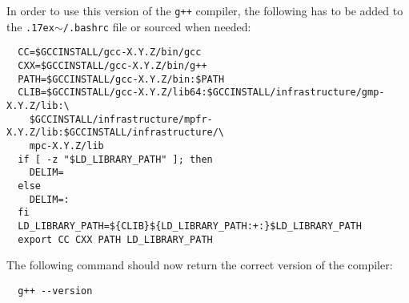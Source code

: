\documentclass[12pt,a4paper]{report}
\newcommand{\mytilde}{\raise.17ex\hbox{$\scriptstyle\mathtt{\sim}$}}		%
\begin{document}
\normalsize
In order to use this version of the \texttt{g++} compiler, the following has to be added to the \texttt{\mytilde/.bashrc} file or sourced when needed:
\footnotesize
\begin{verbatim}
  CC=$GCCINSTALL/gcc-X.Y.Z/bin/gcc
  CXX=$GCCINSTALL/gcc-X.Y.Z/bin/g++
  PATH=$GCCINSTALL/gcc-X.Y.Z/bin:$PATH
  CLIB=$GCCINSTALL/gcc-X.Y.Z/lib64:$GCCINSTALL/infrastructure/gmp-X.Y.Z/lib:\
    $GCCINSTALL/infrastructure/mpfr-X.Y.Z/lib:$GCCINSTALL/infrastructure/\
    mpc-X.Y.Z/lib
  if [ -z "$LD_LIBRARY_PATH" ]; then
    DELIM=
  else
    DELIM=:
  fi
  LD_LIBRARY_PATH=${CLIB}${LD_LIBRARY_PATH:+:}$LD_LIBRARY_PATH
  export CC CXX PATH LD_LIBRARY_PATH
\end{verbatim}
\normalsize
The following command should now return the correct version of the compiler:
\footnotesize
\begin{verbatim}
  g++ --version
\end{verbatim}
\normalsize
\end{document}
